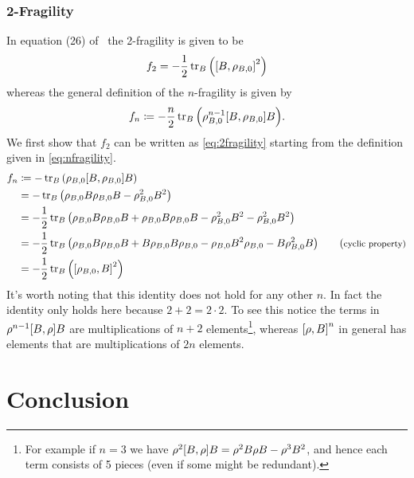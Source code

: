 \documentclass[11pt,english]{article}
\theoremstyle{definition}
\begin{document}
\subsubsection{2-Fragility}
In equation (26) of~\cite{dynamic-entropies} the 2-fragility is given to be
\begin{equation}\label{eq:2fragility}
	f_2 = -\frac{1}{2}\tr_B\qty(\comm{B}{\rho_{B, 0}}^2)
\end{equation}
whereas the general definition of the $n$-fragility is given by
\begin{equation}\label{eq:nfragility}
	f_n\coloneqq -\frac{n}{2}\tr_B\qty(\rho_{B, 0}^{n-1}\comm{B}{\rho_{B, 0}}B).
\end{equation}
We first show that $f_2$ can be written as \cref{eq:2fragility} starting from the definition given in \cref{eq:nfragility}.
\begin{align*}
	f_n & \coloneqq -\tr_B\qty(\rho_{B, 0}\comm{B}{\rho_{B, 0}}B)                                                                                                         \\
	    & = -\tr_B\qty(\rho_{B, 0}B\rho_{B, 0}B - \rho_{B, 0}^2B^2)                                                                                                       \\
	    & = -\frac{1}{2}\tr_B\qty(\rho_{B, 0}B\rho_{B, 0}B + \rho_{B, 0}B\rho_{B, 0}B - \rho_{B, 0}^2B^2 - \rho_{B, 0}^2B^2)                                              \\
	    & = -\frac{1}{2}\tr_B\qty(\rho_{B, 0}B\rho_{B, 0}B + B\rho_{B, 0}B\rho_{B, 0} - \rho_{B, 0}B^2\rho_{B, 0} - B\rho_{B, 0}^2B) \tag{\footnotesize{cyclic property}} \\
	    & = -\frac{1}{2}\tr_B\qty(\comm{\rho_{B, 0}}{B}^2)
\end{align*}
It's worth noting that this identity does not hold for any other $n$. In fact the identity only holds here because $2+2 = 2\cdot 2$. To see this notice the terms in $\rho^{n-1}\comm{B}{\rho}B$ are multiplications of $n+2$ elements\footnote{For example if $n = 3$ we have $\rho^{2}\comm{B}{\rho}B = \rho^2B\rho B - \rho^3B^2$, and hence each term consists of 5 pieces (even if some might be redundant).}, whereas $\comm{\rho}{B}^n$ in general has elements that are multiplications of $2n$ elements.



\section{Conclusion}
\end{document}
